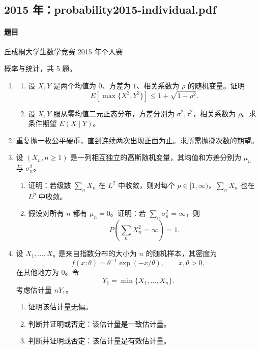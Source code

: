 \documentclass[UTF8,12pt]{ctexart}
\begin{document}
\subsection{2015 年：probability2015-individual.pdf}
\paragraph{题目}
丘成桐大学生数学竞赛 2015 年个人赛

概率与统计，共 5 题。

\begin{enumerate}[label=\textbf{\arabic*.},leftmargin=2.2em]
\item
\begin{enumerate}[label=\textbf{(\alph*)},leftmargin=2.4em]
\item 设 \(X,Y\) 是两个均值为 \(0\)、方差为 \(1\)、相关系数为 \(\rho\) 的随机变量。证明
\[
E[\max\{X^2,Y^2\}]\le 1+\sqrt{1-\rho^2}.
\]
\item 设 \(X,Y\) 服从零均值二元正态分布，方差分别为 \(\sigma^2,\tau^2\)，相关系数为 \(\rho\)。求条件期望 \(E(X\mid Y)\)。
\end{enumerate}

\item 重复抛一枚公平硬币，直到连续两次出现正面为止。求所需抛掷次数的期望。

\item 设 \((X_n,n\ge1)\) 是一列相互独立的高斯随机变量，其均值和方差分别为 \(\mu_n\) 与 \(\sigma_n^2\)。
\begin{enumerate}[label=\textbf{(\alph*)},leftmargin=2.4em]
\item 证明：若级数 \(\sum_n X_n\) 在 \(L^2\) 中收敛，则对每个 \(p\in[1,\infty)\)，\(\sum_n X_n\) 也在 \(L^p\) 中收敛。
\item 假设对所有 \(n\) 都有 \(\mu_n=0\)。证明：若 \(\sum_n\sigma_n^2=\infty\)，则
\[
P\left(\sum_n X_n^2=\infty\right)=1.
\]
\end{enumerate}

\item 设 \(X_1,\ldots,X_n\) 是来自指数分布的大小为 \(n\) 的随机样本，其密度为
\[
f(x;\theta)=\theta^{-1}\exp(-x/\theta),\qquad x,\theta>0,
\]
在其他地方为 \(0\)。令
\[
Y_1=\min\{X_1,\ldots,X_n\}.
\]
考虑估计量 \(nY_1\)。
\begin{enumerate}[label=\textbf{(\alph*)},leftmargin=2.4em]
\item 证明该估计量无偏。
\item 判断并证明或否定：该估计量是一致估计量。
\item 判断并证明或否定：该估计量是有效估计量。
\end{enumerate}


\end{enumerate}
\end{document}
